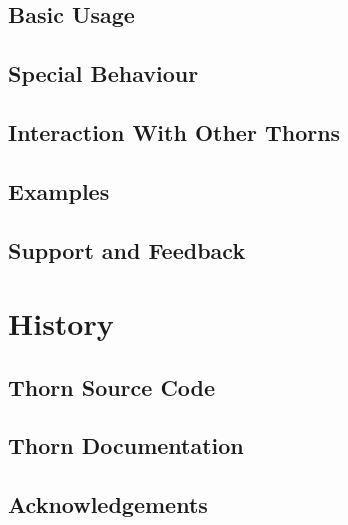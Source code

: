 \subsection{Basic Usage}

\subsection{Special Behaviour}

\subsection{Interaction With Other Thorns}

\subsection{Examples}

\subsection{Support and Feedback}

\section{History}

\subsection{Thorn Source Code}

\subsection{Thorn Documentation}

\subsection{Acknowledgements}


\begin{thebibliography}{9}

\end{thebibliography}



